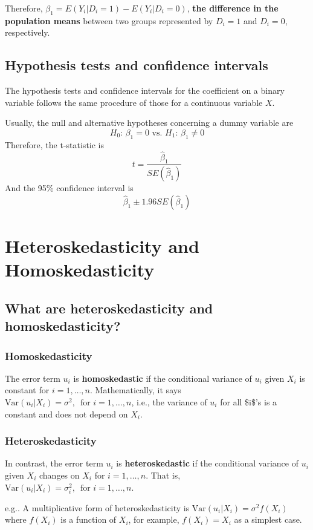 \documentclass[a4paper,11pt]{article}
\newcommand{\var}{\mathrm{Var}}
\begin{document}
Therefore, \(\beta_1 = E(Y_i | D_i = 1) - E(Y_i |D_i = 0)\), \textbf{the
difference in the population means} between two groups represented by
\(D_i = 1\) and \(D_i = 0\), respectively.

\subsection{Hypothesis tests and confidence intervals}
\label{sec:org818d01d}
The hypothesis tests and confidence intervals for the coefficient on a
binary variable follows the same procedure of those for a continuous
variable \(X\). 

Usually, the null and alternative hypotheses concerning a dummy variable are
\[ H_0:\, \beta_1 = 0 \text{ vs. } H_1:\, \beta_1 \neq 0 \]
Therefore, the t-statistic is 
\[ t = \frac{\hat{\beta}_1}{SE(\hat{\beta}_1)} \]
And the 95\% confidence interval is
\[ \hat{\beta}_1 \pm 1.96 SE(\hat{\beta}_1) \]

\section{Heteroskedasticity and Homoskedasticity}
\label{sec:orgb731b06}
\subsection{What are heteroskedasticity and homoskedasticity?}
\label{sec:orgb91b4a6}
\subsubsection*{Homoskedasticity}
\label{sec:org65d88d8}
The error term \(u_i\) is \textbf{homoskedastic} if the conditional variance of
\(u_i\) given \(X_i\) is constant for \(i = 1, \ldots, n\). Mathematically,
it says \(\var(u_i | X_i) = \sigma^2,\, \text{ for } i = 1, \ldots, n\),
i.e., the variance of \(u_i\) for all \$i\$'s is a constant and does not
depend on \(X_i\).

\subsubsection*{Heteroskedasticity}
\label{sec:org03e1e95}
In contrast, the error term \(u_i\) is \textbf{heteroskedastic} if the conditional variance of
\(u_i\) given \(X_i\) changes on \(X_i\) for \(i = 1, \ldots, n\). That is,
\(\var(u_i | X_i) = \sigma^2_i,\, \text{ for } i = 1, \ldots, n\). 

e.g.. A multiplicative form of heteroskedasticity is \(\var(u_i|X_i)
= \sigma^2 f(X_i)\) where \(f(X_i)\) is a function of \(X_i\), for
example, \(f(X_i) = X_i\) as a simplest case. 
\end{document}
